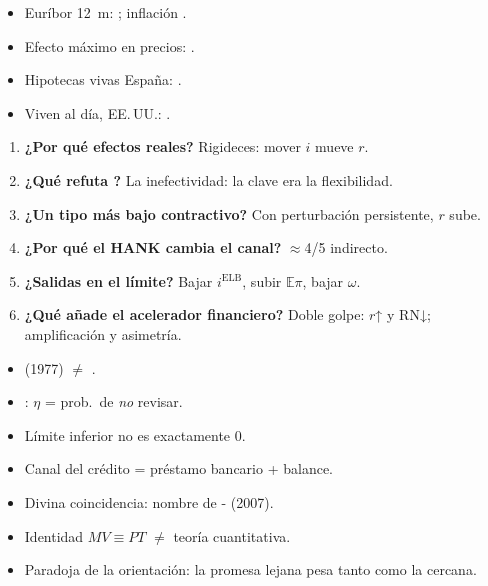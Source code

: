 \documentclass{article}
\begin{document}
\begin{columnas}
\anexorepaso
{}
\begin{itemize}
\item Euríbor 12~m: ; inflación .
\item Efecto máximo en precios: .
\item Hipotecas vivas España: .
\item Viven al día, EE.\,UU.: .
\end{itemize}
\begin{enumerate}
\item \textbf{¿Por qué efectos reales?} Rigideces: mover $i$ mueve $r$.
\item \textbf{¿Qué refuta ?} La inefectividad: la clave era la flexibilidad.
\item \textbf{¿Un tipo más bajo contractivo?} Con perturbación persistente, $r$ sube.
\item \textbf{¿Por qué el HANK cambia el canal?} $\approx$4/5 indirecto.
\item \textbf{¿Salidas en el límite?} Bajar $i^{\mathrm{ELB}}$, subir $\mathbb E\pi$, bajar $\omega$.
\item \textbf{¿Qué añade el acelerador financiero?} Doble golpe: $r$↑ y RN↓; amplificación y asimetría.
\end{enumerate}
\begin{trampa}
\begin{itemize}
\item {} (1977) $\neq$ .
\item {}: $\eta$ = prob.\ de \emph{no} revisar.
\item Límite inferior no es exactamente 0.
\item Canal del crédito = préstamo bancario + balance.
\item Divina coincidencia: nombre de - (2007).
\item Identidad $MV\equiv PT$ $\neq$ teoría cuantitativa.
\item Paradoja de la orientación: la promesa lejana pesa tanto como la cercana.
\end{itemize}
\end{trampa}

\end{columnas}
\end{document}
